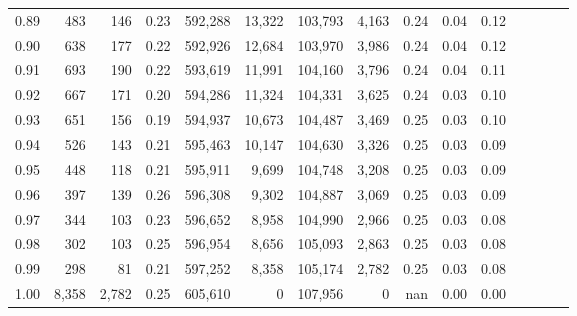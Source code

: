 \begin{tabular}{rrrcrrrrrrrrrrr}
0.89 &     483 &     146 &                                       0.23 &  592,288 &   13,322 &  103,793 &    4,163 &  0.24 &  0.04 &                         0.12 \\
0.90 &     638 &     177 &                                       0.22 &  592,926 &   12,684 &  103,970 &    3,986 &  0.24 &  0.04 &                         0.12 \\
0.91 &     693 &     190 &                                       0.22 &  593,619 &   11,991 &  104,160 &    3,796 &  0.24 &  0.04 &                         0.11 \\
0.92 &     667 &     171 &                                       0.20 &  594,286 &   11,324 &  104,331 &    3,625 &  0.24 &  0.03 &                         0.10 \\
0.93 &     651 &     156 &                                       0.19 &  594,937 &   10,673 &  104,487 &    3,469 &  0.25 &  0.03 &                         0.10 \\
0.94 &     526 &     143 &                                       0.21 &  595,463 &   10,147 &  104,630 &    3,326 &  0.25 &  0.03 &                         0.09 \\
0.95 &     448 &     118 &                                       0.21 &  595,911 &    9,699 &  104,748 &    3,208 &  0.25 &  0.03 &                         0.09 \\
0.96 &     397 &     139 &                                       0.26 &  596,308 &    9,302 &  104,887 &    3,069 &  0.25 &  0.03 &                         0.09 \\
0.97 &     344 &     103 &                                       0.23 &  596,652 &    8,958 &  104,990 &    2,966 &  0.25 &  0.03 &                         0.08 \\
0.98 &     302 &     103 &                                       0.25 &  596,954 &    8,656 &  105,093 &    2,863 &  0.25 &  0.03 &                         0.08 \\
0.99 &     298 &      81 &                                       0.21 &  597,252 &    8,358 &  105,174 &    2,782 &  0.25 &  0.03 &                         0.08 \\
1.00 &   8,358 &   2,782 &                                       0.25 &  605,610 &        0 &  107,956 &        0 &   nan &  0.00 &                         0.00 \\
\bottomrule
\end{tabular}
